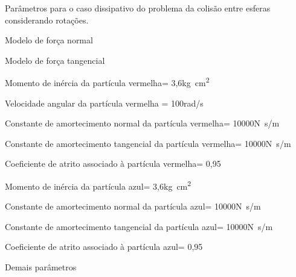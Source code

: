 \begin{table}[h]
\centering
\caption{Parâmetros para o caso dissipativo do problema da colisão entre esferas considerando rotações.}
\label{tab:colliding_spheres:dissipative:rotation:parameters}
\begin{parametersdesc}
	\item{Modelo de força normal}{}{\emptyUnit}
	\item{Modelo de força tangencial}{}{\emptyUnit}
	\hline
	\item{Momento de inércia da partícula vermelha}{\redMomentOfInertia = 3,6}{\si[per-mode=symbol]{\kilogram\square\centi\meter}}
	\item{Velocidade angular da partícula vermelha}{\initial{\redAngularVelocityScalar} = 100}{\si[per-mode=symbol]{\radian\per\second}}
	\item{Constante de amortecimento normal da partícula vermelha}{\redNormalDampingConstant = \SI{10000}{}}{\si[per-mode=symbol]{\newton\second\per\meter}}
	\item{Constante de amortecimento tangencial da partícula vermelha}{\redTangentialDampingConstant = \SI{10000}{}}{\si[per-mode=symbol]{\newton\second\per\meter}}
	\item{Coeficiente de atrito associado à partícula vermelha}{\redDynamicFriction = 0,95}{\emptyUnit}
	\hline
	\item{Momento de inércia da partícula azul}{\blueMomentOfInertia = 3,6}{\si[per-mode=symbol]{\kilogram\square\centi\meter}}
	\item{Constante de amortecimento normal da partícula azul}{\blueNormalDampingConstant = \SI{10000}{}}{\si[per-mode=symbol]{\newton\second\per\meter}}
	\item{Constante de amortecimento tangencial da partícula azul}{\blueTangentialDampingConstant = \SI{10000}{}}{\si[per-mode=symbol]{\newton\second\per\meter}}
	\item{Coeficiente de atrito associado à partícula azul}{\blueDynamicFriction = 0,95}{\emptyUnit}
	\hline
	\item{Demais parâmetros}{}{}
\end{parametersdesc}
\sourceMe 
\end{table}

